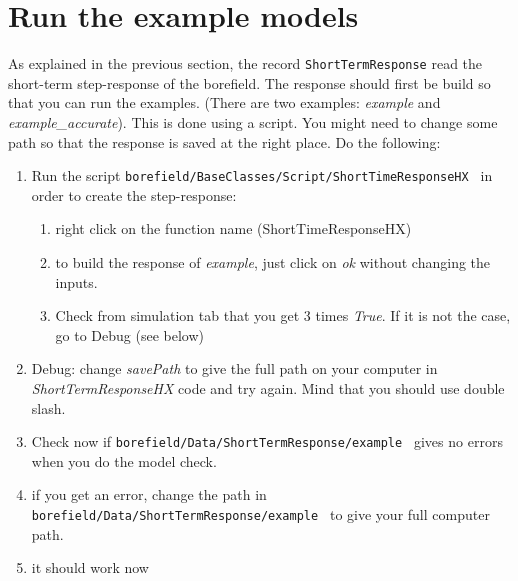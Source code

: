 \documentclass[a4paper,oneside,11pt]{report}
\begin{document}
\section{Run the example models}
As explained in the previous section, the record {\tt ShortTermResponse} read the short-term step-response of the borefield. The response should first be build so that you can run the examples. (There are two examples: \textit{example} and \textit{example\_accurate}). This is done using a script. You might need to change some path so that the response is saved at the right place. Do the following:

\begin{enumerate}
\item Run the script {\tt borefield/BaseClasses/Script/ShortTimeResponseHX } in order to create the step-response:
	\begin{enumerate}
	\item right click on the function name (ShortTimeResponseHX)
	\item to build the response of \textit{example}, just click on \textit{ok} without changing the inputs.
	\item Check from simulation tab that you get 3 times \textit{True}. If it is not the case, go to Debug (see below)
	\end{enumerate}
\item Debug: change \textit{savePath} to give the full path on your computer in \textit{ShortTermResponseHX} code and try again. Mind that you should use double slash.
\item Check now if {\tt borefield/Data/ShortTermResponse/example } gives no errors when you do the model check.
\item if you get an error, change the path in {\tt borefield/Data/ShortTermResponse/example } to give your full computer path.
\item it should work now
\end{enumerate}
\end{document}
